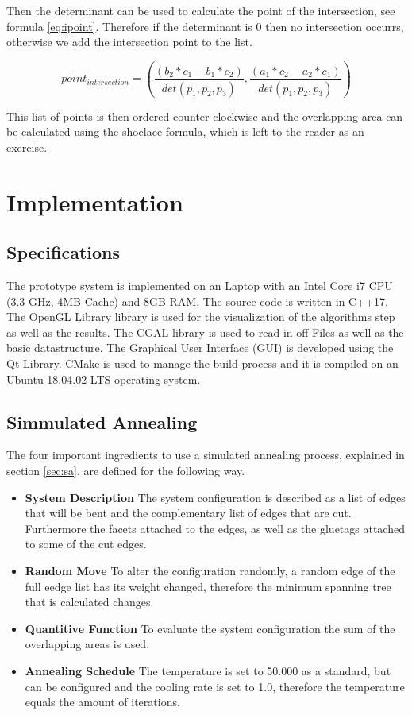 \documentclass[draft,final]{vutinfth} %
\begin{document}
Then the determinant can be used to calculate the point of the intersection, see formula \ref{eq:ipoint}. Therefore if the determinant is $0$ then no intersection occurrs, otherwise we add the intersection point to the list.

\begin{equation}
\label{eq:ipoint}
point_{intersection} = (\frac{(b_2*c_1 - b_1*c_2)}{det(p_1, p_2, p_3)},\frac{(a_1*c_2 - a_2*c_1)}{det(p_1, p_2, p_3)})
\end{equation}

This list of points is then ordered counter clockwise and the overlapping area can be calculated using the shoelace formula, which is left to the reader as an exercise.

\chapter{Implementation}
\label{chap:Implementation}

\section{Specifications}

The prototype system is implemented on an Laptop with an Intel Core i7 CPU (3.3 GHz, 4MB Cache) and 8GB RAM. The source code is written in C++17. The OpenGL Library library is used for the visualization of the algorithms step as well as the results. The CGAL library is used to read in off-Files as well as the basic datastructure. The Graphical User Interface (GUI) is developed using the Qt Library. CMake is used to manage the build process and it is compiled on an Ubuntu 18.04.02 LTS operating system.

\section{Simmulated Annealing}

The four important ingredients to use a simulated annealing process, explained in section \ref{sec:sa}, are defined for the following way.
\begin{itemize}
	\item \textbf{System Description} The system configuration is described as a list of edges that will be bent and the complementary list of edges that are cut. Furthermore the facets attached to the edges, as well as the gluetags attached to some of the cut edges.
	\item \textbf{Random Move} To alter the configuration randomly, a random edge of the full eedge list has its weight changed, therefore the minimum spanning tree that is calculated changes.
	\item \textbf{Quantitive Function} To evaluate the system configuration the sum of the overlapping areas is used.
	\item \textbf{Annealing Schedule} The temperature is set to 50.000 as a standard, but can be configured and the cooling rate is set to 1.0, therefore the temperature equals the amount of iterations.
\end{itemize}
\end{document}
